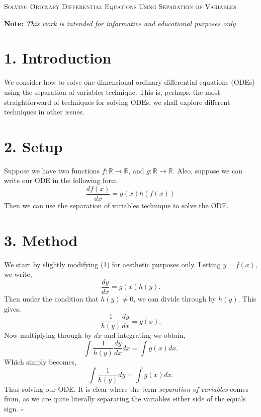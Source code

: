 \documentclass[11pt]{article}
\begin{document}

\begin{tcolorbox}
\begin{center}
    \large
    \textsc{Solving Ordinary Differential Equations Using Separation of Variables}
\end{center}
\end{tcolorbox}

\begin{center}
\textbf{Note:} \textit{This work is intended for informative and educational purposes only.}
\end{center}

\section*{1. Introduction}
We consider how to solve one-dimensional ordinary differential equations (ODEs) using the separation of variables technique. This is, perhaps, the most straightforward of techniques for solving ODEs, we shall explore different techniques in other issues.

\section*{2. Setup}
Suppose we have two functions $f: \mathbb{R} \longrightarrow \mathbb{R}$, and $g: \mathbb{R} \longrightarrow \mathbb{R}$. Also, suppose we can write our ODE in the following form.
\begin{equation}
    \frac{df(x)}{dx} = g(x)h(f(x))
\end{equation}
Then we can use the separation of variables technique to solve the ODE. 

\section*{3. Method}
We start by slightly modifying (1) for aesthetic purposes only. Letting $y = f(x)$, we write,
\begin{equation}
    \frac{dy}{dx} = g(x)h(y).
\end{equation}
Then under the condition that $h(y) \neq 0$, we can divide through by $h(y)$. This gives,
\begin{equation}
    \frac{1}{h(y)} \frac{dy}{dx} = g(x).
\end{equation}
Now multiplying through by $dx$ and integrating we obtain,
\begin{equation}
   \int \frac{1}{h(y)} \frac{dy}{dx} dx = \int g(x) dx .
\end{equation}
Which simply becomes,
\begin{equation}
   \int \frac{1}{h(y)} dy = \int g(x) dx .
\end{equation}
Thus solving our ODE. It is clear where the term \textit{separation of variables} comes from, as we are quite literally separating the variables either side of the equals sign. $\square$
\end{document}
